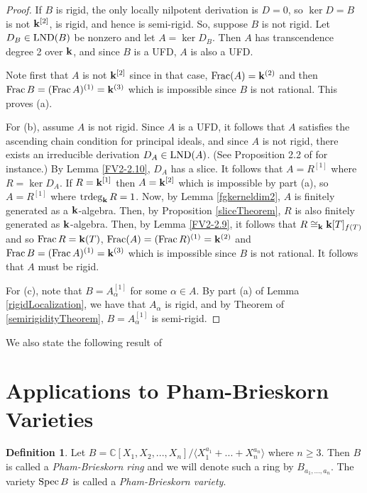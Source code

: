 \documentclass[12pt]{amsart}
\theoremstyle{plain}
\theoremstyle{definition}
\newtheorem{definition}[subsection]{Definition}
\newcommand{\Spec}{		\operatorname{{\rm Spec}}}
\newcommand{\trdeg}{	\operatorname{{\rm trdeg}}}
\newcommand{\Frac}{		\operatorname{{\rm Frac}}}
\newcommand{\lb}{\langle}
\newcommand{\rb}{\rangle}
\newcommand{\Comp}{\ensuremath{\mathbb{C}}}
\newcommand{\bk}{{\ensuremath{\rm \bf k}}}
\newcommand{\lnd}{\operatorname{{\rm LND}}}
\newcommand{\isom}{\cong}
\begin{document}
\begin{proof}
	If $B$ is rigid, the only locally nilpotent derivation is $D = 0$, so $\ker D = B$ is not $\bk^{[2]}$, is rigid, and hence is semi-rigid. So, suppose $B$ is not rigid. Let $D_B \in \lnd(B)$ be nonzero and let $A = \ker D_B$. Then $A$ has transcendence degree 2 over $\bk$, and since $B$ is a UFD, $A$ is also a UFD. 
	
	Note first that $A$ is not $\bk^{[2]}$ since in that case, $\Frac(A) = \bk^{(2)}$ and then $\Frac B = (\Frac A)^{(1)} = \bk^{(3)}$ which is impossible since $B$ is not rational. This proves (a).
	
	For (b), assume $A$ is not rigid. Since $A$ is a UFD, it follows that $A$ satisfies the ascending chain condition for principal ideals, and since $A$ is not rigid, there exists an irreducible derivation $D_A \in \lnd(A)$. (See Proposition 2.2 of \cite{freudenburg2017algebraic} for instance.) By Lemma \ref{FV2-2.10}, $D_A$ has a slice. It follows that $A = R^{[1]}$ where $R = \ker D_A$. If $R = \bk^{[1]}$ then $A = \bk^{[2]}$ which is impossible by part (a), so $A = R^{[1]}$ where $\trdeg_\bk R = 1$. Now, by Lemma \ref{fgkerneldim2}, $A$ is finitely generated as a $\bk$-algebra. Then, by Proposition \ref{sliceTheorem}, $R$ is also finitely generated as $\bk$-algebra. Then, by Lemma \ref{FV2-2.9}, it follows that $R \isom_\bk \bk[T]_{f(T)}$ and so $\Frac R = \bk(T)$, $\Frac(A) = (\Frac R)^{(1)} = \bk^{(2)}$ and $\Frac B = (\Frac A)^{(1)} = \bk^{(3)}$ which is impossible since $B$ is not rational. It follows that $A$ must be rigid.
	
	For (c), note that $B = A_\alpha^{[1]}$ for some $\alpha \in A$. By part (a) of Lemma \ref{rigidLocalization}, we have that $A_\alpha$ is rigid, and by Theorem of \ref{semirigidityTheorem}, $B = A_\alpha^{[1]}$ is semi-rigid.      		
\end{proof}

We also state the following result of 

\section{Applications to Pham-Brieskorn Varieties}

\begin{definition}
Let  $B = \Comp[X_1,X_2,...,X_n]/ \lb X_1^{a_1} + ... + X_n^{a_n} \rb$ where $n \geq 3$.  Then $B$ is called a \textit{Pham-Brieskorn ring} and we will denote such a ring by $B_{a_1, ..., a_n}$.  The variety $\Spec B$ is called a \textit{Pham-Brieskorn variety}.
\end{definition}
\end{document}
